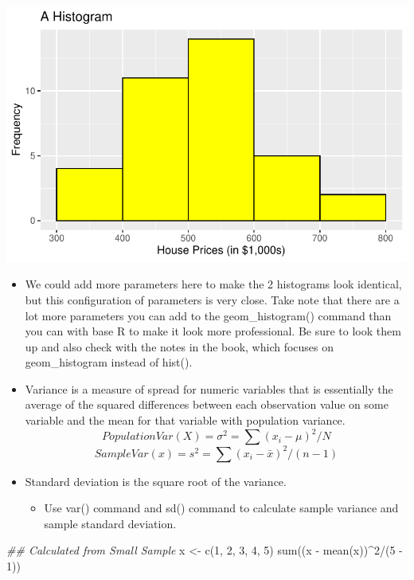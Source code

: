\documentclass[
  letterpaper,
  DIV=11,
  numbers=noendperiod]{scrreprt}
\newenvironment{Shaded}{\begin{snugshade}}{\end{snugshade}}
\newcommand{\DecValTok}[1]{\textcolor[rgb]{0.68,0.00,0.00}{#1}}
\newcommand{\DocumentationTok}[1]{\textcolor[rgb]{0.37,0.37,0.37}{\textit{#1}}}
\newcommand{\FunctionTok}[1]{\textcolor[rgb]{0.28,0.35,0.67}{#1}}
\newcommand{\NormalTok}[1]{\textcolor[rgb]{0.00,0.23,0.31}{#1}}
\newcommand{\OtherTok}[1]{\textcolor[rgb]{0.00,0.23,0.31}{#1}}
\newcommand{\SpecialCharTok}[1]{\textcolor[rgb]{0.37,0.37,0.37}{#1}}
\providecommand{\tightlist}{%
  \setlength{\itemsep}{0pt}\setlength{\parskip}{0pt}}\usepackage{longtable,booktabs,array}
\begin{document}
\includegraphics{descriptives_files/figure-pdf/unnamed-chunk-25-1.pdf}

\begin{itemize}
\item
  We could add more parameters here to make the 2 histograms look
  identical, but this configuration of parameters is very close. Take
  note that there are a lot more parameters you can add to the
  geom\_histogram() command than you can with base R to make it look
  more professional. Be sure to look them up and also check with the
  notes in the book, which focuses on geom\_histogram instead of hist().
\item
  Variance is a measure of spread for numeric variables that is
  essentially the average of the squared differences between each
  observation value on some variable and the mean for that variable with
  population variance.
  \[Population Var(X) = \sigma^2 = \sum{(x_i-\mu)^2}/N\]
  \[Sample Var(x) = s^2 = \sum{(x_i-\bar{x})^2}/(n-1)\]
\item
  Standard deviation is the square root of the variance.

  \begin{itemize}
  \tightlist
  \item
    Use var() command and sd() command to calculate sample variance and
    sample standard deviation.
  \end{itemize}
\end{itemize}

\begin{Shaded}
\begin{Highlighting}[]
\DocumentationTok{\#\# Calculated from Small Sample}
\NormalTok{x }\OtherTok{\textless{}{-}} \FunctionTok{c}\NormalTok{(}\DecValTok{1}\NormalTok{, }\DecValTok{2}\NormalTok{, }\DecValTok{3}\NormalTok{, }\DecValTok{4}\NormalTok{, }\DecValTok{5}\NormalTok{)}
\FunctionTok{sum}\NormalTok{((x }\SpecialCharTok{{-}} \FunctionTok{mean}\NormalTok{(x))}\SpecialCharTok{\^{}}\DecValTok{2}\SpecialCharTok{/}\NormalTok{(}\DecValTok{5} \SpecialCharTok{{-}} \DecValTok{1}\NormalTok{))}
\end{Highlighting}
\end{Shaded}
\end{document}
